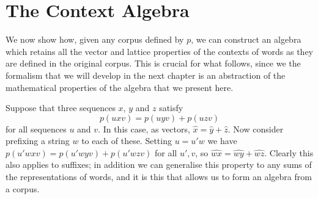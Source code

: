 \documentclass[12pt]{report}
\begin{document}
\section{The Context Algebra}

We now show how, given any corpus defined by $p$, we can construct an algebra which retains all the vector and lattice properties of the contexts of words as they are defined in the original corpus. This is crucial for what follows, since we the formalism that we will develop in the next chapter is an abstraction of the mathematical properties of the algebra that we present here.

Suppose that three sequences $x$, $y$ and $z$ satisfy
$$p(uxv) = p(uyv) + p(uzv)$$
for all sequences $u$ and $v$. In this case, as vectors, $\hat{x} = \hat{y} + \hat{z}$. Now consider prefixing a string $w$ to each of these. Setting $u = u'w$ we have $p(u'wxv) = p(u'wyv) + p(u'wzv)$ for all $u',v$, so $\widehat{wx} = \widehat{wy} + \widehat{wz}$. Clearly this also applies to suffixes; in addition we can generalise this property to any sums of the representations of words, and it is this that allows us to form an algebra from a corpus.
\end{document}
